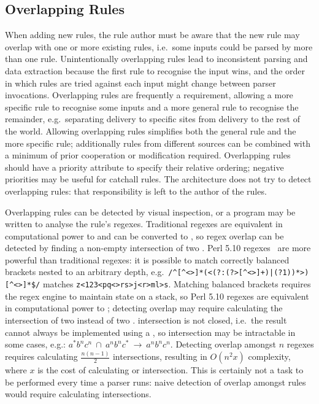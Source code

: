 \subsection{Overlapping Rules}

\label{overlapping rules in architecture}

When adding new rules, the rule author must be aware that the new rule may
overlap with one or more existing rules, i.e.\ some inputs could be parsed
by more than one rule.  Unintentionally overlapping rules lead to
inconsistent parsing and data extraction because the first rule to
recognise the input wins, and the order in which rules are tried against
each input might change between parser invocations.  Overlapping rules are
frequently a requirement, allowing a more specific rule to recognise some
inputs and a more general rule to recognise the remainder, e.g.\ separating
 delivery to specific sites from  delivery to
the rest of the world.  Allowing overlapping rules simplifies both the
general rule and the more specific rule; additionally rules from different
sources can be combined with a minimum of prior cooperation or modification
required.  Overlapping rules should have a priority attribute to specify
their relative ordering; negative priorities may be useful for catchall
rules.  The architecture does not try to detect overlapping rules: that
responsibility is left to the author of the rules.

Overlapping rules can be detected by visual inspection, or a program may be
written to analyse the rule's regexes.  Traditional regexes are equivalent
in computational power to  and can be converted to
, so regex overlap can be detected by finding a non-empty
intersection of two \@.  Perl 5.10 regexes~\cite{perlre} are
more powerful than traditional regexes: it is possible to match correctly
balanced brackets nested to an arbitrary depth, e.g.\
\verb!/^[^<>]*(<(?:(?>[^<>]+)|(?1))*>)[^<>]*$/!  matches
\verb!z<123<pq<>rs>j<r>ml>s!.  Matching balanced brackets requires the
regex engine to maintain state on a stack, so Perl 5.10 regexes are
equivalent in computational power to ; detecting overlap may
require calculating the intersection of two  instead of two
\acronym{FA}.   intersection is not closed, i.e.\ the result
cannot always be implemented using a \acronym{PDA}, so intersection may be
intractable in some cases, e.g.:
$a^{*}b^{n}c^{n}~\cap~a^{n}b^{n}c^{*}~\rightarrow~a^{n}b^{n}c^{n}$.
Detecting overlap amongst $n$ regexes requires calculating
$\frac{n\left(n-1\right)}{2}$ intersections, resulting in
$O\left(n^{2}x\right)$ complexity, where $x$ is the cost of calculating
\acronym{FA} or \acronym{PDA} intersection.  This is certainly not a task
to be performed every time a parser runs: naive detection of overlap
amongst \parsernames{} \numberOFrules{} rules would require calculating
\numberOFruleINTERSECTIONS{} intersections.


